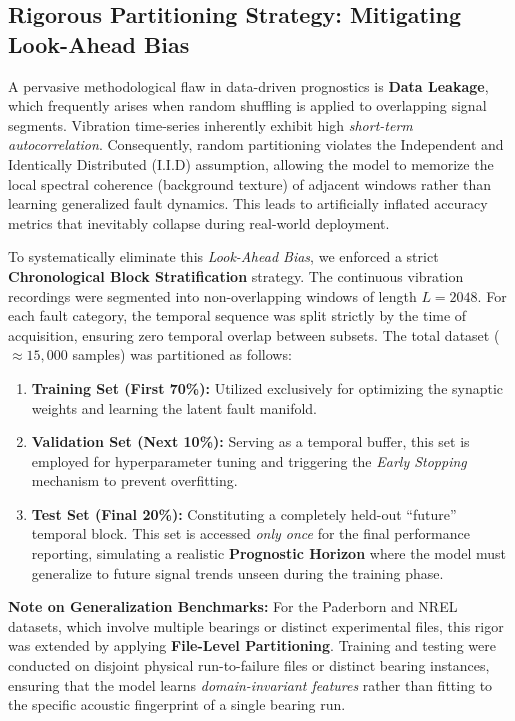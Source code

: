 \documentclass[5p,times,twocolumn]{elsarticle}
\begin{document}
\subsection{Rigorous Partitioning Strategy: Mitigating Look-Ahead Bias}
\label{subsec:partitioning}
A pervasive methodological flaw in data-driven prognostics is \textbf{Data Leakage}, which frequently arises when random shuffling is applied to overlapping signal segments. Vibration time-series inherently exhibit high \textit{short-term autocorrelation}. Consequently, random partitioning violates the Independent and Identically Distributed (I.I.D) assumption, allowing the model to memorize the local spectral coherence (background texture) of adjacent windows rather than learning generalized fault dynamics. This leads to artificially inflated accuracy metrics that inevitably collapse during real-world deployment.



To systematically eliminate this \textit{Look-Ahead Bias}, we enforced a strict \textbf{Chronological Block Stratification} strategy. The continuous vibration recordings were segmented into non-overlapping windows of length $L=2048$. For each fault category, the temporal sequence was split strictly by the time of acquisition, ensuring zero temporal overlap between subsets. 
The total dataset ($\approx 15,000$ samples) was partitioned as follows:

\begin{enumerate}
    \item \textbf{Training Set (First 70\%):} Utilized exclusively for optimizing the synaptic weights and learning the latent fault manifold.
    \item \textbf{Validation Set (Next 10\%):} Serving as a temporal buffer, this set is employed for hyperparameter tuning and triggering the \textit{Early Stopping} mechanism to prevent overfitting.
    \item \textbf{Test Set (Final 20\%):} Constituting a completely held-out ``future'' temporal block. This set is accessed \textit{only once} for the final performance reporting, simulating a realistic \textbf{Prognostic Horizon} where the model must generalize to future signal trends unseen during the training phase.
\end{enumerate}

\textbf{Note on Generalization Benchmarks:} For the Paderborn and NREL datasets, which involve multiple bearings or distinct experimental files, this rigor was extended by applying \textbf{File-Level Partitioning}. Training and testing were conducted on disjoint physical run-to-failure files or distinct bearing instances, ensuring that the model learns \textit{domain-invariant features} rather than fitting to the specific acoustic fingerprint of a single bearing run.
\end{document}
